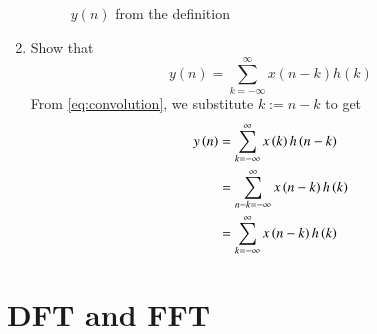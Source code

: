 \documentclass[journal,12pt,twocolumn]{IEEEtran}
\renewcommand\thesection{\arabic{section}}
\begin{document}
\begin{enumerate}[label=\thesection.\arabic*]
\begin{figure}[!ht]
	\caption{$y(n)$ from the definition}
	\label{fig:y-n-conv}
\end{figure}
\item Show that
\begin{equation}
y(n) =  \sum_{k=-\infty}^{\infty}x(n-k)h(k)
\end{equation}
\solution 
From \eqref{eq:convolution}, we substitute $k := n - k$ to get
\begin{align}
y\left(n\right) &= \sum_{k=-\infty}^{\infty}x\left(k\right)h\left(n - k\right) \\
		  &= \sum_{n - k=-\infty}^{\infty}x\left(n - k\right)h\left(k\right) \\
		  &= \sum_{k=-\infty}^{\infty}x\left(n - k\right)h\left(k\right)
\end{align}
\end{enumerate}

\section{DFT and FFT}
\end{document}
